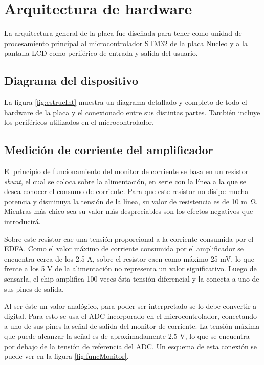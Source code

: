 \section{Arquitectura de hardware}

La arquitectura general de la placa fue diseñada para tener como unidad de procesamiento principal al microcontrolador STM32 de la placa Nucleo y a la pantalla LCD como periférico de entrada y salida del usuario.

\subsection{Diagrama del dispositivo}

La figura \ref{fig:estrucInt} muestra un diagrama detallado y completo de todo el hardware de la placa y el conexionado entre sus distintas partes. También incluye los periféricos utilizados en el microcontrolador.


\subsection{Medición de corriente del amplificador}

El principio de funcionamiento del monitor de corriente se basa en un resistor \textit{shunt}, el cual se coloca sobre la alimentación, en serie con la línea a la que se desea conocer el consumo de corriente. Para que este resistor no disipe mucha potencia y disminuya la tensión de la línea, su valor de resistencia es de 10 \si{m\ohm}. Mientras más chico sea su valor más despreciables son los efectos negativos que introducirá.

Sobre este resistor cae una tensión proporcional a la corriente consumida por el EDFA. Como el valor máximo de corriente consumida por el amplificador se encuentra cerca de los 2.5 A, sobre el resistor caen como máximo 25 mV, lo que frente a los 5 V de la alimentación no representa un valor significativo. Luego de sensarla, el chip amplifica 100 veces ésta tensión diferencial y la conecta a uno de sus pines de salida.

Al ser éste un valor analógico, para poder ser interpretado se lo debe convertir a digital. Para esto se usa el ADC incorporado en el microcontrolador, conectando a uno de sus pines la señal de salida del monitor de corriente. La tensión máxima que puede alcanzar la señal es de aproximadamente 2.5 V, lo que se encuentra por debajo de la tensión de referencia del ADC. Un esquema de esta conexión se puede ver en la figura \ref{fig:funcMonitor}.

